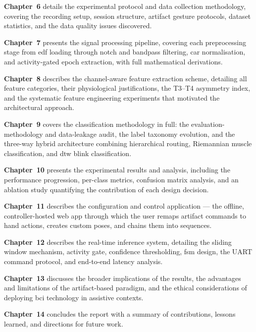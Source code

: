 \textbf{Chapter~6} details the experimental protocol and data
collection methodology, covering the recording setup, session
structure, artifact gesture protocols, dataset statistics, and the
data quality issues discovered.

\textbf{Chapter~7} presents the signal processing pipeline, covering
each preprocessing stage from \acrshort{edf} loading through notch
and bandpass filtering, \acrshort{car} normalisation, and
activity-gated epoch extraction, with full mathematical derivations.

\textbf{Chapter~8} describes the channel-aware feature extraction
scheme, detailing all feature categories, their physiological
justifications, the T3--T4 asymmetry index, and the systematic
feature engineering experiments that motivated the architectural
approach.

\textbf{Chapter~9} covers the classification methodology in full:
the evaluation-methodology and data-leakage audit, the label
taxonomy evolution, and the three-way hybrid architecture combining
hierarchical routing, Riemannian muscle classification, and
\acrshort{dtw} blink classification.

\textbf{Chapter~10} presents the experimental results and analysis,
including the performance progression, per-class metrics, confusion
matrix analysis, and an ablation study quantifying the contribution
of each design decision.

\textbf{Chapter~11} describes the configuration and control
application --- the offline, controller-hosted web app through which
the user remaps artifact commands to hand actions, creates custom
poses, and chains them into sequences.

\textbf{Chapter~12} describes the real-time inference system,
detailing the sliding window mechanism, activity gate, confidence
thresholding, \acrshort{fsm} design, the UART command protocol, and
end-to-end latency analysis.

\textbf{Chapter~13} discusses the broader implications of the
results, the advantages and limitations of the artifact-based
paradigm, and the ethical considerations of deploying \acrshort{bci}
technology in assistive contexts.

\textbf{Chapter~14} concludes the report with a summary of
contributions, lessons learned, and directions for future work.